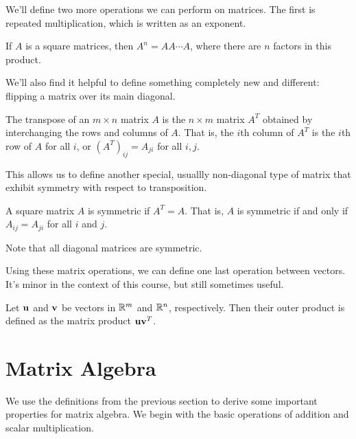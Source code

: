 \documentclass[../m73main.tex]{subfiles}
\begin{document}
We'll define two more operations we can perform on matrices.
The first is repeated multiplication, which is written as an exponent.

\begin{definition}
	If $A$ is a square matrices, then $A^n = AA\cdots A$, where there are $n$ factors in this product.
\end{definition}

We'll also find it helpful to define something completely new and different: flipping a matrix over its main diagonal.

\begin{definition}
	The transpose of an $m\times n$ matrix $A$ is the $n\times m$ matrix $A^T$ obtained by interchanging the rows and columns of $A$.
	That is, the $i$th column of $A^T$ is the $i$th row of $A$ for all $i$, or $(A^T)_{ij} = A_{ji}$ for all $i, j$.
\end{definition}

This allows us to define another special, usuallly non-diagonal type of matrix that exhibit symmetry with respect to transposition.

\begin{definition}
	A square matrix $A$ is symmetric if $A^T = A$.
	That is, $A$ is symmetric if and only if $A_{ij} = A_{ji}$ for all $i$ and $j$.
\end{definition}

Note that all diagonal matrices are symmetric.

Using these matrix operations, we can define one last operation between vectors.
It's minor in the context of this course, but still sometimes useful.

\begin{definition}
	Let $\mathbf{u}$ and $\mathbf{v}$ be vectors in $\mathbb{R}^m$ and $\mathbb{R}^n$, respectively.
	Then their outer product is defined as the matrix product $\mathbf{u}\mathbf{v}^T$.
\end{definition}

\section{Matrix Algebra}
We use the definitions from the previous section to derive some important properties for matrix algebra.
We begin with the basic operations of addition and scalar multiplication.
\end{document}
